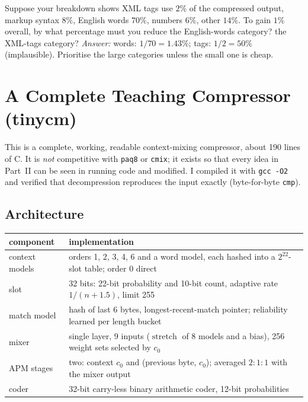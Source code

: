 \documentclass[11pt,a4paper,openany]{book}
\newcommand{\st}{\operatorname{stretch}}
\newcommand{\code}[1]{\texttt{#1}}
\theoremstyle{definition}
\theoremstyle{remark}
\begin{document}
\begin{exercise}
Suppose your breakdown shows XML tags use $2\%$ of the compressed output, markup syntax $8\%$, English words $70\%$, numbers $6\%$, other $14\%$. To gain $1\%$ overall, by what percentage must you reduce the English-words category? the XML-tags category? \emph{Answer:} words: $1/70=1.43\%$; tags: $1/2=50\%$ (implausible). Prioritise the large categories unless the small one is cheap.
\end{exercise}


\appendix

\chapter{A Complete Teaching Compressor (tinycm)}
\label{app:code}

This is a complete, working, readable context-mixing compressor, about 190 lines of C. It is \emph{not} competitive with \code{paq8} or \code{cmix}; it exists so that every idea in Part~II can be seen in running code and modified. I compiled it with \code{gcc -O2} and verified that decompression reproduces the input exactly (byte-for-byte \code{cmp}).

\section{Architecture}

\begin{center}
\begin{tabular}{@{}lp{10.5cm}@{}}
\toprule
component & implementation\\
\midrule
context models & orders 1, 2, 3, 4, 6 and a word model, each hashed into a $2^{22}$-slot table; order 0 direct\\
slot & 32 bits: 22-bit probability and 10-bit count, adaptive rate $1/(n+1.5)$, limit 255\\
match model & hash of last 6 bytes, longest-recent-match pointer; reliability learned per length bucket\\
mixer & single layer, 9 inputs ($\st$ of 8 models and a bias), 256 weight sets selected by $c_0$\\
APM stages & two: context $c_0$ and (previous byte, $c_0$); averaged $2{:}1{:}1$ with the mixer output\\
coder & 32-bit carry-less binary arithmetic coder, 12-bit probabilities\\
\bottomrule
\end{tabular}
\end{center}
\end{document}
